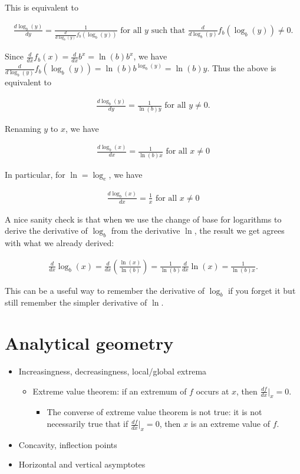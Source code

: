 This is equivalent to

\begin{align*}
    \frac{d\log_b(y)}{dy} = \frac{1}{\frac{d}{d\log_b(y)}f_b(\log_b(y))} \text{ for all $y$ such that $\frac{d}{d\log_b(y)}f_b(\log_b(y)) \neq 0$}.
\end{align*}

Since $\frac{d}{dx}f_b(x) = \frac{d}{dx} b^x = \ln(b) b^x$, we have $\frac{d}{d\log_b(y)}f_b(\log_b(y)) = \ln(b) b^{\log_b(y)} = \ln(b) y$. Thus the above is equivalent to

\begin{align*}
    \frac{d\log_b(y)}{dy} = \frac{1}{\ln(b) y} \text{ for all $y \neq 0$}.
\end{align*}

Renaming $y$ to $x$, we have

\begin{align*}
    \boxed
    {
        \frac{d\log_b(x)}{dx} = \frac{1}{\ln(b) x} \text{ for all $x \neq 0$}
    }
\end{align*}

In particular, for $\ln = \log_e$, we have

\begin{align*}
    \boxed
    {
        \frac{d\log_b(x)}{dx} = \frac{1}{x} \text{ for all $x \neq 0$}
    }
\end{align*}

A nice sanity check is that when we use the change of base for logarithms to derive the derivative of $\log_b$ from the derivative $\ln$, the result we get agrees with what we already derived:

\begin{align*}
    \frac{d}{dx}\log_b(x) = \frac{d}{dx}\left( \frac{\ln(x)}{\ln(b)} \right) = \frac{1}{\ln(b)} \frac{d}{dx} \ln(x) = \frac{1}{\ln(b) x}.
\end{align*}

This can be a useful way to remember the derivative of $\log_b$ if you forget it but still remember the simpler derivative of $\ln$.

\section*{Analytical geometry}

\begin{itemize}
    \item Increasingness, decreasingness, local/global extrema
    \begin{itemize}
        \item Extreme value theorem: if an extremum of $f$ occurs at $x$, then $\frac{df}{dx}\Big|_x = 0$.
        \begin{itemize}
            \item The converse of extreme value theorem is not true: it is not necessarily true that if $\frac{df}{dx}\Big|_x = 0$, then $x$ is an extreme value of $f$.
        \end{itemize}
    \end{itemize}
    \item Concavity, inflection points
    \item Horizontal and vertical asymptotes
\end{itemize}

